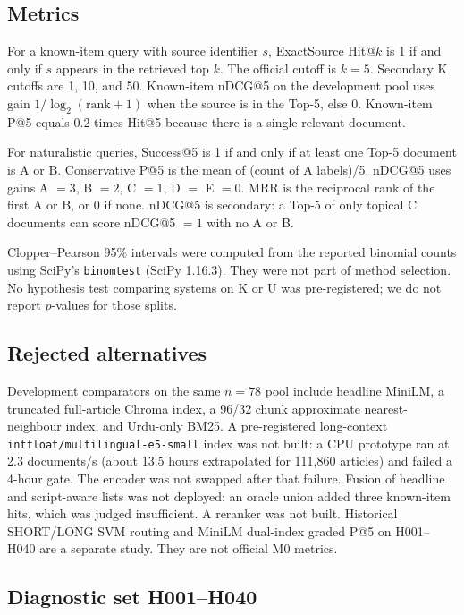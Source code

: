 \documentclass[10pt,letterpaper]{article}
\begin{document}
\subsection*{Metrics}

For a known-item query with source identifier $s$, ExactSource Hit@$k$ is 1 if and only if $s$ appears in the retrieved top $k$. The official cutoff is $k = 5$. Secondary K cutoffs are 1, 10, and 50. Known-item nDCG@5 on the development pool uses gain $1/\log_2(\mathrm{rank}+1)$ when the source is in the Top-5, else 0. Known-item P@5 equals 0.2 times Hit@5 because there is a single relevant document.

For naturalistic queries, Success@5 is 1 if and only if at least one Top-5 document is A or B. Conservative P@5 is the mean of (count of A labels)/5. nDCG@5 uses gains A $= 3$, B $= 2$, C $= 1$, D $=$ E $= 0$. MRR is the reciprocal rank of the first A or B, or 0 if none. nDCG@5 is secondary: a Top-5 of only topical C documents can score nDCG@5 $= 1$ with no A or B.

Clopper--Pearson 95\% intervals were computed from the reported binomial counts using SciPy's \texttt{binomtest} (SciPy 1.16.3). They were not part of method selection. No hypothesis test comparing systems on K or U was pre-registered; we do not report $p$-values for those splits.

\subsection*{Rejected alternatives}

Development comparators on the same $n = 78$ pool include headline MiniLM, a truncated full-article Chroma index, a 96/32 chunk approximate nearest-neighbour index, and Urdu-only BM25. A pre-registered long-context \texttt{intfloat/multilingual-e5-small} index was not built: a CPU prototype ran at 2.3 documents/s (about 13.5 hours extrapolated for 111,860 articles) and failed a 4-hour gate. The encoder was not swapped after that failure. Fusion of headline and script-aware lists was not deployed: an oracle union added three known-item hits, which was judged insufficient. A reranker was not built. Historical SHORT/LONG SVM routing and MiniLM dual-index graded P@5 on H001--H040 are a separate study. They are not official M0 metrics.

\subsection*{Diagnostic set H001--H040}
\end{document}
